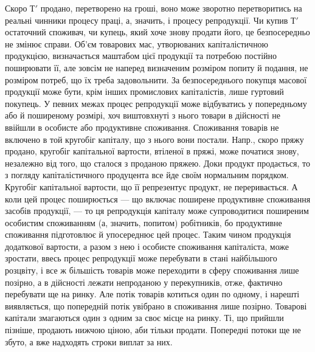 Скоро $Т'$ продано, перетворено на гроші, воно може зворотно перетворитись
на реальні чинники процесу праці, а, значить, і процесу репродукції.
Чи купив $Т'$ остаточний споживач, чи купець, який хоче знову продати
його, це безпосередньо не змінює справи. Об’єм товарових мас, утворюваних
капіталістичною продукцією, визначається маштабом цієї продукції
та потребою постійно поширювати її, але зовсім не наперед визначеним
розміром попиту й подання, не розміром потреб, що їх треба задовольнити.
За безпосереднього покупця масової продукції може бути, крім
інших промислових капіталістів, лише гуртовий покупець. У певних
межах процес репродукції може відбуватись у попередньому або й
поширеному розмірі, хоч виштовхнуті з нього товари в дійсності не
ввійшли в особисте або продуктивне споживання. Споживання товарів не
включено в той кругобіг капіталу, що з нього вони постали. Напр.,
скоро пряжу продано, кругобіг капітальної вартости, втіленої в пряжі,
може початися знову, незалежно від того, що сталося з проданою пряжею.
Доки продукт продається, то з погляду капіталістичного продуцента
все йде своїм нормальним порядком. Кругобіг капітальної вартости, що
її репрезентує продукт, не переривається. А коли цей процес поширюється
— що включає поширене продуктивне споживання засобів продукції,
— то ця репродукція капіталу може супроводитися поширеним
особистим споживанням (а, значить, попитом) робітників, бо продуктивне
споживання підготовлює й упосереднює цей процес. Таким
чином продукція додаткової вартости, а разом з нею і особисте
споживання капіталіста, може зростати, ввесь процес репродукції може
перебувати в стані найбільшого розцвіту, і все ж більшість товарів
може переходити в сферу споживання лише позірно, а в
дійсності лежати непроданою у перекупників, отже, фактично перебувати
ще на ринку. Але потік товарів котиться один по одному, і нарешті
виявляється, що попередній потік увібрано в споживання лише позірно.
Товарові капітали змагаються один з одним за своє місце на ринку. Ті,
що прийшли пізніше, продають нижчою ціною, аби тільки продати.
Попередні потоки ще не збуто, а вже надходять строки виплат за них.
\parbreak{}  %
